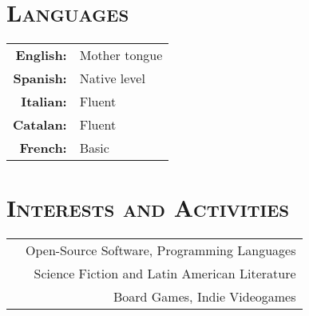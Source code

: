 \documentclass[a4paper,10pt]{article} %
\newcommand*{\justifyheading}{\raggedright}
\begin{document}
\begin{minipage}[t]{0.5\textwidth}
\section{\textsc{Languages}}
\smallskip
\begin{tabular}{rl}
 \textbf{English:} & Mother tongue  \\

 \textbf{Spanish:} & Native level  \\

 \textbf{Italian:} & Fluent  \\

 \textbf{Catalan:} & Fluent  \\

 \textbf{French:} & Basic
\end{tabular}
\end{minipage}\hspace{-0.01\textwidth}
%
%
\begin{minipage}[t]{0.505\textwidth}
\renewcommand{\justifyheading}{\raggedleft}
\section{\textsc{Interests and Activities}}
\smallskip
\begin{tabularx}{\textwidth}{Xr}
& Open-Source Software, Programming Languages\\
& Science Fiction and Latin American Literature \\
& Board Games, Indie Videogames
\end{tabularx}
\end{minipage}



\end{document}
